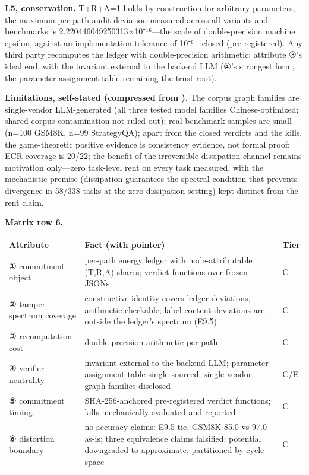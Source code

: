 \documentclass[11pt,a4paper]{article}
\begin{document}
\textbf{L5, conservation.} T+R+A=1 holds by construction for arbitrary parameters; the maximum per-path audit deviation measured across all variants and benchmarks is 2.220446049250313×10⁻¹⁶—the scale of double-precision machine epsilon, against an implementation tolerance of 10⁻⁶—closed (pre-registered). Any third party recomputes the ledger with double-precision arithmetic: attribute ③'s ideal end, with the invariant external to the backend LLM (④'s strongest form, the parameter-assignment table remaining the trust root).

\textbf{Limitations, self-stated (compressed from \cite{key04}).} The corpus graph families are single-vendor LLM-generated (all three tested model families Chinese-optimized; shared-corpus contamination not ruled out); real-benchmark samples are small (n=100 GSM8K, n=99 StrategyQA); apart from the closed verdicts and the kills, the game-theoretic positive evidence is consistency evidence, not formal proof; ECR coverage is 20/22; the benefit of the irreversible-dissipation channel remains motivation only—zero task-level rent on every task measured, with the mechanistic premise (dissipation guarantees the spectral condition that prevents divergence in 58/338 tasks at the zero-dissipation setting) kept distinct from the rent claim.

\noindent\textbf{Matrix row 6.}

\begin{table}[htbp]
\centering
\footnotesize
\setlength{\tabcolsep}{3.5pt}
\renewcommand{\arraystretch}{1.18}
\begin{tabularx}{0.985\textwidth}{>{\raggedright\arraybackslash}p{} >{\raggedright\arraybackslash}X >{\raggedright\arraybackslash}p{}}
\toprule
\textbf{Attribute} & \textbf{Fact (with pointer)} & \textbf{Tier} \\
\midrule
① commitment object & per-path energy ledger with node-attributable (T,R,A) shares; verdict functions over frozen JSONs \cite{key04} & C \\
② tamper-spectrum coverage & constructive identity covers ledger deviations, arithmetic-checkable; label-content deviations are outside the ledger's spectrum (E9.5) \cite{key04} & C \\
③ recomputation cost & double-precision arithmetic per path \cite{key04} & C \\
④ verifier neutrality & invariant external to the backend LLM; parameter-assignment table single-sourced; single-vendor graph families disclosed \cite{key04} & C\slash E \\
⑤ commitment timing & SHA-256-anchored pre-registered verdict functions; kills mechanically evaluated and reported \cite{key04} & C \\
⑥ distortion boundary & no accuracy claims: E9.5 tie, GSM8K 85.0 vs 97.0 as-is; three equivalence claims falsified; potential downgraded to approximate, partitioned by cycle space \cite{key04} & C \\
\bottomrule
\end{tabularx}
\end{table}
\end{document}
